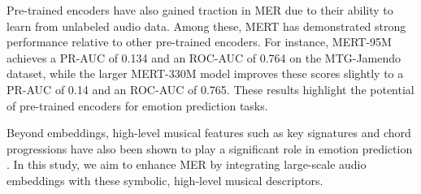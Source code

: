 Pre-trained encoders have also gained traction in MER due to their ability to learn from unlabeled audio data. Among these, MERT \cite{yizhi2023mert} has demonstrated strong performance relative to other pre-trained encoders. For instance, MERT-95M achieves a PR-AUC of 0.134 and an ROC-AUC of 0.764 on the MTG-Jamendo dataset, while the larger MERT-330M model improves these scores slightly to a PR-AUC of 0.14 and an ROC-AUC of 0.765. These results highlight the potential of pre-trained encoders for emotion prediction tasks.

Beyond embeddings, high-level musical features such as key signatures and chord progressions have also been shown to play a significant role in emotion prediction \cite{cho2016music}. In this study, we aim to enhance MER by integrating large-scale audio embeddings with these symbolic, high-level musical descriptors.


